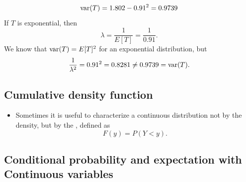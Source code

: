 \begin{itemize}
\begin{example}
\begin{equation*}
{\rm var}(T) =  1.802 -  0.91^2 = 0.9739
\end{equation*}
If $T$ is exponential, then 
\begin{equation*}
\lambda = \frac{1}{E[T]}=\frac{1}{0.91}.
\end{equation*}
We know that ${\rm var}(T) = E[T]^2$ for an exponential distribution, but 
\begin{equation*}
 \frac{1}{\lambda^2} = 0.91^2 = 0.8281 \ne  0.9739= {\rm var}(T). 
\end{equation*}


\end{example}

\end{itemize}


 \subsection{Cumulative density function}
 \begin{itemize}
\item Sometimes it is useful to characterize a continuous distribution not by the density, but by the , defined as 
\begin{equation*}
F(y) = P(Y<y).
\end{equation*}
  \end{itemize}
  
  

 \subsection{Conditional probability and expectation with Continuous variables}
 
